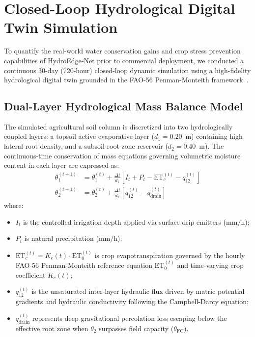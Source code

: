 \section{Closed-Loop Hydrological Digital Twin Simulation}
\label{sec:digital_twin}

To quantify the real-world water conservation gains and crop stress prevention capabilities of HydroEdge-Net prior to commercial deployment, we conducted a continuous 30-day (720-hour) closed-loop dynamic simulation using a high-fidelity hydrological digital twin grounded in the FAO-56 Penman-Monteith framework~\cite{allen1998crop}.

\subsection{Dual-Layer Hydrological Mass Balance Model}

The simulated agricultural soil column is discretized into two hydrologically coupled layers: a topsoil active evaporative layer ($d_1 = 0.20$~m) containing high lateral root density, and a subsoil root-zone reservoir ($d_2 = 0.40$~m). The continuous-time conservation of mass equations governing volumetric moisture content in each layer are expressed as:
\begin{align}
\theta_1^{(t+1)} &= \theta_1^{(t)} + \frac{\Delta t}{d_1} \left[ I_t + P_t - \text{ET}_c^{(t)} - q_{12}^{(t)} \right] \label{eq:fao_layer1} \\
\theta_2^{(t+1)} &= \theta_2^{(t)} + \frac{\Delta t}{d_2} \left[ q_{12}^{(t)} - q_{\text{drain}}^{(t)} \right] \label{eq:fao_layer2}
\end{align}
where:
\begin{itemize}
    \item $I_t$ is the controlled irrigation depth applied via surface drip emitters ($\mathrm{mm/h}$);
    \item $P_t$ is natural precipitation ($\mathrm{mm/h}$);
    \item $\text{ET}_c^{(t)} = K_c(t) \cdot \text{ET}_0^{(t)}$ is crop evapotranspiration governed by the hourly FAO-56 Penman-Monteith reference equation $\text{ET}_0^{(t)}$ and time-varying crop coefficient $K_c(t)$;
    \item $q_{12}^{(t)}$ is the unsaturated inter-layer hydraulic flux driven by matric potential gradients and hydraulic conductivity following the Campbell-Darcy equation;
    \item $q_{\text{drain}}^{(t)}$ represents deep gravitational percolation loss escaping below the effective root zone when $\theta_2$ surpasses field capacity ($\theta_{\text{FC}}$).
\end{itemize}

